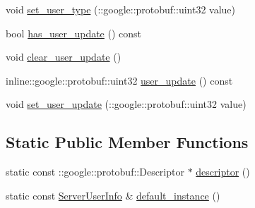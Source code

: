 \begin{DoxyCompactItemize}
\item 
void \hyperlink{class_i_m_1_1_base_define_1_1_server_user_info_a1990fdda0110b74c3a5f4c17f4b851a7}{set\+\_\+user\+\_\+type} (\+::google\+::protobuf\+::uint32 value)
\item 
bool \hyperlink{class_i_m_1_1_base_define_1_1_server_user_info_a09064603dbc11e110d99c5bff29e0287}{has\+\_\+user\+\_\+update} () const 
\item 
void \hyperlink{class_i_m_1_1_base_define_1_1_server_user_info_a902e28f598a24a6a329e97b51b5d70e5}{clear\+\_\+user\+\_\+update} ()
\item 
inline\+::google\+::protobuf\+::uint32 \hyperlink{class_i_m_1_1_base_define_1_1_server_user_info_a3c21c3c1d269b09fb848b20920910251}{user\+\_\+update} () const 
\item 
void \hyperlink{class_i_m_1_1_base_define_1_1_server_user_info_a749306a53d482e83538b82b3a2fe02ae}{set\+\_\+user\+\_\+update} (\+::google\+::protobuf\+::uint32 value)
\end{DoxyCompactItemize}
\subsection*{Static Public Member Functions}
\begin{DoxyCompactItemize}
\item 
static const \+::google\+::protobuf\+::\+Descriptor $\ast$ \hyperlink{class_i_m_1_1_base_define_1_1_server_user_info_a46051bcce5d70958ea7ce1509cb27ead}{descriptor} ()
\item 
static const \hyperlink{class_i_m_1_1_base_define_1_1_server_user_info}{Server\+User\+Info} \& \hyperlink{class_i_m_1_1_base_define_1_1_server_user_info_a9d6ed309832d0fa9a703c11dde8c58da}{default\+\_\+instance} ()
\end{DoxyCompactItemize}
